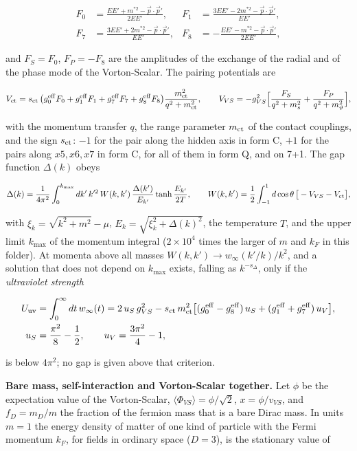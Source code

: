 \documentclass[
  10pt,
]{article}
\begin{document}
\[\begin{aligned}
F_0&=\frac{EE'+m^{*2}-\vec p\cdot\vec p'}{2EE'},&
F_1&=\frac{3EE'-2m^{*2}-\vec p\cdot\vec p'}{EE'},\\
F_7&=\frac{3EE'+2m^{*2}-\vec p\cdot\vec p'}{EE'},&
F_8&=-\frac{EE'-m^{*2}-\vec p\cdot\vec p'}{2EE'},
\end{aligned}\]

and \(F_S=F_0\), \(F_P=-F_8\) are the amplitudes of the exchange of the
radial and of the phase mode of the Vorton-Scalar. The pairing
potentials are

\[V_{\rm ct}=s_{\rm ct}\,\big(g_0^{\rm eff}F_0+g_1^{\rm eff}F_1+g_7^{\rm eff}F_7+g_8^{\rm eff}F_8\big)\frac{m_{\rm ct}^2}{q^2+m_{\rm ct}^2},\qquad
V_{VS}=-g_{VS}^2\Big[\frac{F_S}{q^2+m_s^2}+\frac{F_P}{q^2+m_\vartheta^2}\Big],\]

with the momentum transfer \(q\), the range parameter \(m_{\rm ct}\) of
the contact couplings, and the sign \(s_{\rm ct}\): \(-1\) for the pair
along the hidden axis in form C, \(+1\) for the pairs along \(x5,x6,x7\)
in form C, for all of them in form Q, and on 7+1. The gap function
\(\Delta(k)\) obeys

\[\Delta(k)=\frac1{4\pi^2}\int_0^{k_{\max}}dk'\,k'^2\,W(k,k')\,\frac{\Delta(k')}{E_{k'}}\tanh\frac{E_{k'}}{2T},\qquad
W(k,k')=\frac12\int_{-1}^{1}d\cos\theta\,\big[-V_{VS}-V_{\rm ct}\big],\]

with \(\xi_k=\sqrt{k^2+m^2}-\mu\), \(E_k=\sqrt{\xi_k^2+\Delta(k)^2}\),
the temperature \(T\), and the upper limit \(k_{\max}\) of the momentum
integral (\(2\times10^4\) times the larger of \(m\) and \(k_F\) in this
folder). At momenta above all masses \(W(k,k')\to w_\infty(k'/k)/k^2\),
and a solution that does not depend on \(k_{\max}\) exists, falling as
\(k^{-s_\Delta}\), only if the \emph{ultraviolet strength}

\[\begin{aligned}
U_{\rm uv}&=\int_0^\infty dt\,w_\infty(t)=2\,u_S\,g_{VS}^2-s_{\rm ct}\,m_{\rm ct}^2\big[(g_0^{\rm eff}-g_8^{\rm eff})\,u_S+(g_1^{\rm eff}+g_7^{\rm eff})\,u_V\big],\\
u_S&=\frac{\pi^2}{8}-\frac12,\qquad u_V=\frac{3\pi^2}{4}-1,
\end{aligned}\]

is below \(4\pi^2\); no gap is given above that criterion.

\textbf{Bare mass, self-interaction and Vorton-Scalar together.} Let
\(\phi\) be the expectation value of the Vorton-Scalar,
\(\langle\Phi_{VS}\rangle=\phi/\sqrt2\), \(x=\phi/v_{VS}\), and
\(f_D=m_D/m\) the fraction of the fermion mass that is a bare Dirac
mass. In units \(m=1\) the energy density of matter of one kind of
particle with the Fermi momentum \(k_F\), for fields in ordinary space
(\(D=3\)), is the stationary value of
\end{document}
